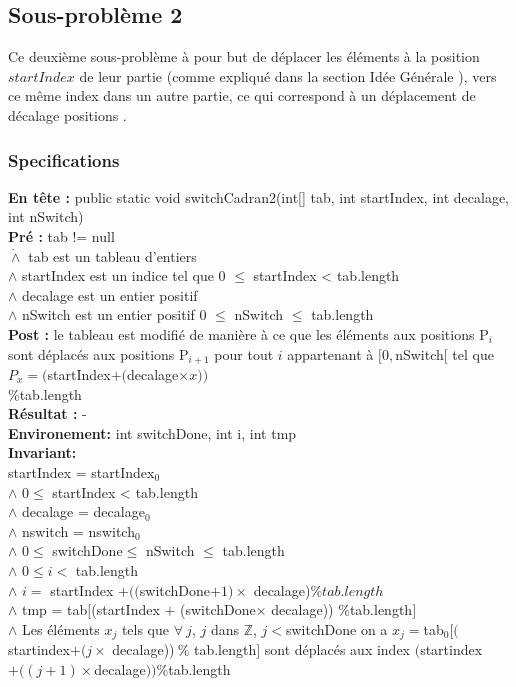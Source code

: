 \subsection{Sous-problème 2}

Ce deuxième sous-problème à pour but de déplacer les éléments à la position $startIndex$ de leur partie (comme expliqué dans la section \og Idée Générale \fg{} ), vers ce même index dans un autre partie, ce qui correspond à un déplacement de \og décalage \fg{}  positions .

\subsubsection*{Specifications}
\noindent \textbf{En tête :} public static void switchCadran2(int[] tab, int startIndex, int decalage, int nSwitch)\\
\noindent \textbf{Pré : } tab != null \\
 	  \indent \indent $\dot{\wedge}$ tab est un tableau d'entiers\\
	  \indent \indent $\wedge$ startIndex est un indice tel que 0 $\leq$ startIndex < tab.length \\
	  \indent \indent $\wedge$ decalage est un entier positif \\
	  \indent \indent $\wedge$ nSwitch est un entier positif 0 $\leq$ nSwitch $\leq$ tab.length\\
\textbf{Post :}  le tableau est modifié de manière à ce que les éléments aux positions P$_{i}$ sont déplacés aux positions P$_{i+1}$ pour tout $i$ appartenant à $[0,$nSwitch$[$ tel que $P_{x} = ($startIndex$ + ($decalage$\times x))$\\
\%tab.length\\
\textbf{Résultat :}  - \\
\textbf{Environement: } int switchDone, int i, int tmp\\

\noindent \textbf{Invariant:}\\
\noindent startIndex = startIndex$_{0}$\\
$\wedge$ $0 \leq$ startIndex < tab.length \\
$\wedge$ decalage = decalage$_{0}$\\
$\wedge$ nswitch = nswitch$_{0}$\\
$\wedge$ $0\leq$ switchDone$ \leq$ nSwitch $\leq$ tab.length\\
$\wedge$ $0\leq i <$ tab.length\\
$\wedge$ $i =$ startIndex $+ (($switchDone$+1)\times$ decalage)$ \% tab.length$\\
$\wedge$ tmp = tab[(startIndex $+$ (switchDone$\times$ decalage))  $\% $tab.length$]$\\
$\wedge$ Les éléments $x_{j}$ tels que $\forall\ j$, $j$ dans $\mathbb{Z}$, $j<$switchDone on a $x_{j}=$tab$_{0}[($startindex$ + (j\times$ decalage))$\ \%$ tab.length$]$ sont déplacés aux index $($startindex$ + ((j+1)\times  $decalage$))\% $tab.length\\

